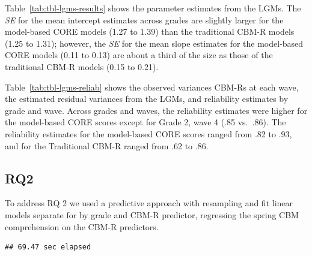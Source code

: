 \documentclass[
  english,
  man, fleqn, noextraspace]{apa6}
\begin{document}
Table~\ref{tab:tbl-lgms-results} shows the parameter estimates from the LGMs. The \emph{SE} for the mean intercept estimates across grades are slightly larger for the model-based CORE models (1.27 to 1.39) than the traditional CBM-R models (1.25 to 1.31); however, the \emph{SE} for the mean slope estimates for the model-based CORE models (0.11 to 0.13) are about a third of the size as those of the traditional CBM-R models (0.15 to 0.21).

Table~\ref{tab:tbl-lgms-reliab} shows the observed variances CBM-Rs at each wave, the estimated residual variances from the LGMs, and reliability estimates by grade and wave. Across grades and waves, the reliability estimates were higher for the model-based CORE scores except for Grade 2, wave 4 (.85 vs.~.86). The reliability estimates for the model-based CORE scores ranged from .82 to .93, and for the Traditional CBM-R ranged from .62 to .86.

\hypertarget{rq2}{%
\subsection{RQ2}\label{rq2}}

To address RQ 2 we used a predictive approach with resampling and fit linear models separate for by grade and CBM-R predictor, regressing the spring CBM comprehension on the CBM-R predictors.

\begin{verbatim}
## 69.47 sec elapsed
\end{verbatim}
\end{document}
